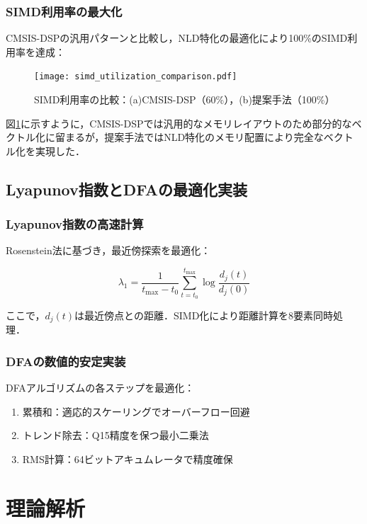 \documentclass[paper]{ieice}
\begin{document}
\subsubsection{SIMD利用率の最大化}
CMSIS-DSPの汎用パターンと比較し，NLD特化の最適化により100\%のSIMD利用率を達成：

\begin{figure}[t]
\centering
\texttt{[image: simd\_utilization\_comparison.pdf]}
\caption{SIMD利用率の比較：(a)CMSIS-DSP（60\%），(b)提案手法（100\%）}
\label{fig:simd_util}
\end{figure}

図\ref{fig:simd_util}に示すように，CMSIS-DSPでは汎用的なメモリレイアウトのため部分的なベクトル化に留まるが，提案手法ではNLD特化のメモリ配置により完全なベクトル化を実現した．

\subsection{Lyapunov指数とDFAの最適化実装}

\subsubsection{Lyapunov指数の高速計算}
Rosenstein法\cite{rosenstein1993}に基づき，最近傍探索を最適化：

\begin{equation}
\lambda_1 = \frac{1}{t_{\max} - t_0} \sum_{t=t_0}^{t_{\max}} \log \frac{d_j(t)}{d_j(0)}
\end{equation}

ここで，$d_j(t)$は最近傍点との距離．SIMD化により距離計算を8要素同時処理．

\subsubsection{DFAの数値的安定実装}
DFAアルゴリズムの各ステップを最適化：

\begin{enumerate}
\item 累積和：適応的スケーリングでオーバーフロー回避
\item トレンド除去：Q15精度を保つ最小二乗法
\item RMS計算：64ビットアキュムレータで精度確保
\end{enumerate}


\section{理論解析}
\end{document}
